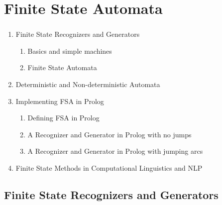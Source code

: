 
\section{Finite State Automata}

\begin{frame}

	\begin{center}
		\Huge \insertsection
	\end{center}

\end{frame}


\begin{frame}

	\frametitle{\insertsection}
	
	\begin{enumerate}
		\item Finite State Recognizers and Generators
		\begin{enumerate}
			\item Basics and simple machines
			\item Finite State Automata
		\end{enumerate}
		\item Deterministic and Non-deterministic Automata
		\item Implementing FSA in Prolog
		\begin{enumerate}
			\item Defining FSA in Prolog
			\item A Recognizer and Generator in Prolog with no jumps
			\item A Recognizer and Generator in Prolog with jumping arcs
		\end{enumerate}
		\item Finite State Methods in Computational Linguistics and NLP
	\end{enumerate}

\end{frame}

\subsection{Finite State Recognizers and Generators}

